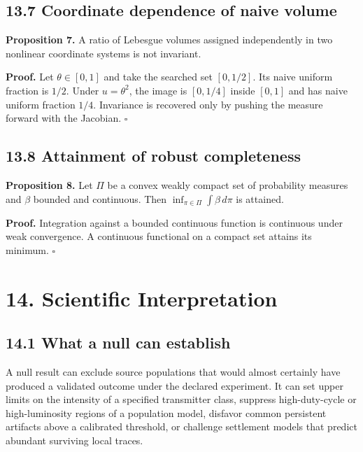 \documentclass[11pt,a4paper]{article}
\begin{document}
\subsection{13.7 Coordinate dependence of naive volume}\label{137-coordinate-dependence-of-naive-volume}

\textbf{Proposition 7.} A ratio of Lebesgue volumes assigned independently in two nonlinear coordinate systems is not invariant.

\textbf{Proof.} Let \(\theta\in[0,1]\) and take the searched set \([0,1/2]\). Its naive uniform fraction is \(1/2\). Under \(u=\theta^2\), the image is \([0,1/4]\) inside \([0,1]\) and has naive uniform fraction \(1/4\). Invariance is recovered only by pushing the measure forward with the Jacobian. \(\square\)

\subsection{13.8 Attainment of robust completeness}\label{138-attainment-of-robust-completeness}

\textbf{Proposition 8.} Let \(\Pi\) be a convex weakly compact set of probability measures and \(\beta\) bounded and continuous. Then \(\inf_{\pi\in\Pi}\int\beta\,d\pi\) is attained.

\textbf{Proof.} Integration against a bounded continuous function is continuous under weak convergence. A continuous functional on a compact set attains its minimum. \(\square\)

\section{14. Scientific Interpretation}\label{14-scientific-interpretation}

\subsection{14.1 What a null can establish}\label{141-what-a-null-can-establish}

A null result can exclude source populations that would almost certainly have produced a validated outcome under the declared experiment. It can set upper limits on the intensity of a specified transmitter class, suppress high-duty-cycle or high-luminosity regions of a population model, disfavor common persistent artifacts above a calibrated threshold, or challenge settlement models that predict abundant surviving local traces.
\end{document}
